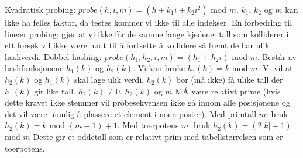 \documentclass[10pt,a4paper]{article}
\begin{document}
\begin{multicols}{4}
{\noindent
\color{red}Kvadratisk probing: \color{black} $probe(h,i,m) = (h + k_1i + k_2i^2)$ mod $m$. $k_1$, $k_2$ og $m$ kan ikke ha felles faktor, da testes kommer vi ikke til alle indekser. En forbedring til lineær probing; gjør at vi ikke får de samme lange kjedene: tall som kolliderer i ett forsøk vil ikke være nødt til å fortsette å kollidere så fremt de har ulik hashverdi.
\noindent
\color{red}Dobbel hashing: \color{black} $probe(h_1,h_2,i,m) = (h_1+h_2i)$ mod $m$. Består av hashfunksjonene $h_1(k)$ og $h_2(k)$. Vi kan bruke $h_1(k) = k$ mod $m$. Vi vil at $h_2(k)$ og $h_1(k)$ skal lage ulik verdi. $h_2(k)$ bør (må ikke) få ulike tall der $h_1(k)$ gir like tall. $h_2(k) \ne 0$. $h_2(k)$ og $m$ MÅ være relativt prime (hvis dette kravet ikke stemmer vil probesekvensen ikke gå innom alle posisjonene og det vil være umulig å plassere et element i noen poster). Med primtall $m$: bruk $h_2(k) = k$ mod $(m-1)+1$. Med toerpotens $m$: bruk $h_2(k) = (2|k|+1)$ mod $m$ Dette gir et oddetall som er relativt prim med tabellstørrelsen som er toerpotens.

}
\end{multicols}
\end{document}

